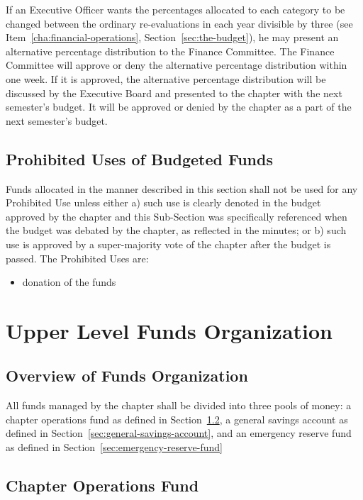 If an Executive Officer wants the percentages allocated to each category to be
changed between the ordinary re-evaluations in each year divisible by three
(see Item~\ref{cha:financial-operations}, Section~\ref{sec:the-budget}), he may
present an alternative percentage distribution to the Finance Committee.
The Finance Committee will approve or deny the alternative percentage
distribution within one week.
If it is approved, the alternative percentage distribution will be discussed by
the Executive Board and presented to the chapter with the next semester’s
budget.
It will be approved or denied by the chapter as a part of the next semester’s
budget.

\subsection{Prohibited Uses of Budgeted Funds}

Funds allocated in the manner described in this section shall not be used for
any Prohibited Use unless either a) such use is clearly denoted in the budget
approved by the chapter and this Sub-Section was specifically referenced when
the budget was debated by the chapter, as reflected in the minutes; or b) such
use is approved by a super-majority vote of the chapter after the budget is
passed.
The Prohibited Uses are: 
\begin{itemize}
    \item donation of the funds
\end{itemize}

\section{Upper Level Funds Organization}

\subsection{Overview of Funds Organization}

All funds managed by the chapter shall be divided into three pools of money: a
chapter operations fund as defined in Section~\ref{sec:chapter-operations-fund},
a general savings account as defined in
Section~\ref{sec:general-savings-account}, and an emergency reserve fund as
defined in Section~\ref{sec:emergency-reserve-fund}

\subsection{Chapter Operations Fund}
\label{sec:chapter-operations-fund}

